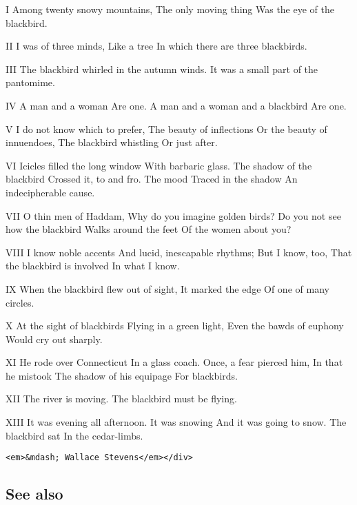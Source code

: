 I Among twenty snowy mountains, The only moving thing Was the eye of the blackbird.

II I was of three minds, Like a tree In which there are three blackbirds.

III The blackbird whirled in the autumn winds. It was a small part of the pantomime.

IV A man and a woman Are one. A man and a woman and a blackbird Are one.

V I do not know which to prefer, The beauty of inflections Or the beauty of innuendoes, The blackbird whistling Or just after.

VI Icicles filled the long window With barbaric glass. The shadow of the blackbird Crossed it, to and fro. The mood Traced in the shadow An indecipherable cause.

VII O thin men of Haddam, Why do you imagine golden birds? Do you not see how the blackbird Walks around the feet Of the women about you?

VIII I know noble accents And lucid, inescapable rhythms; But I know, too, That the blackbird is involved In what I know.

IX When the blackbird flew out of sight, It marked the edge Of one of many circles.

X At the sight of blackbirds Flying in a green light, Even the bawds of euphony Would cry out sharply.

XI He rode over Connecticut In a glass coach. Once, a fear pierced him, In that he mistook The shadow of his equipage For blackbirds.

XII The river is moving. The blackbird must be flying.

XIII It was evening all afternoon. It was snowing And it was going to snow. The blackbird sat In the cedar-limbs.

\begin{verbatim}
<em>&mdash; Wallace Stevens</em></div>
\end{verbatim}

\hypertarget{see-also}{%
\subsection{See also}\label{see-also}}

